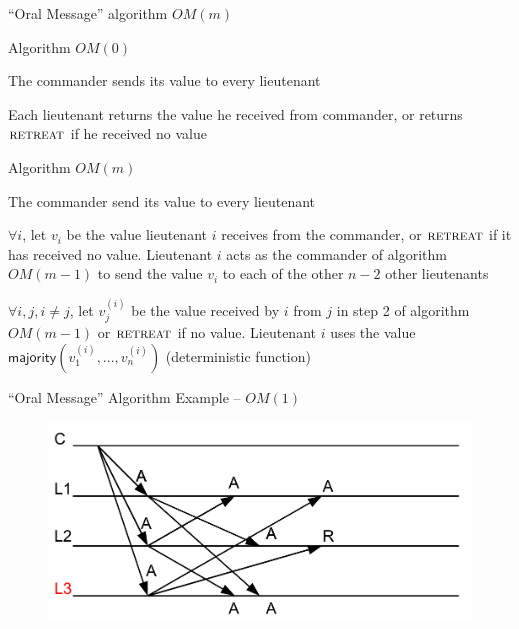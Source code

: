 \begin{frame}{“Oral Message” algorithm $OM(m)$}

\BIL
\item Algorithm $OM(0)$
	\BE
	\item The commander sends its value to every lieutenant
	\item Each lieutenant returns the value he received from commander, or returns $\textsc{retreat}$ if he received no value
	\EE
\item Algorithm $OM(m)$
	\BE
	\item The commander send its value to every lieutenant
	\item $\forall i$, let $v_i$ be the value lieutenant $i$ receives from the
	commander, or $\textsc{retreat}$ if it has received no value. Lieutenant $i$ acts as the
	commander of algorithm $OM(m-1)$ to send the value $v_i$ to each of the other $n-2$
	other lieutenants
	\item $\forall i,j, i \neq j$, let $v_j^{(i)}$ be the value received by $i$ from $j$
	in step 2 of algorithm $OM(m-1)$ or $\textsc{retreat}$ if no value. Lieutenant $i$ uses
	the value $\mathsf{majority}(v_1^{(i)}, ..., v_n^{(i)})$ (deterministic function)
	\EE
\EIL
\end{frame}

\begin{frame}{“Oral Message” Algorithm Example -- $OM(1)$}
	
\begin{figure}	
	\includegraphics[width=\textwidth]{figs/14/oral}
\end{figure}
	
\end{frame}



